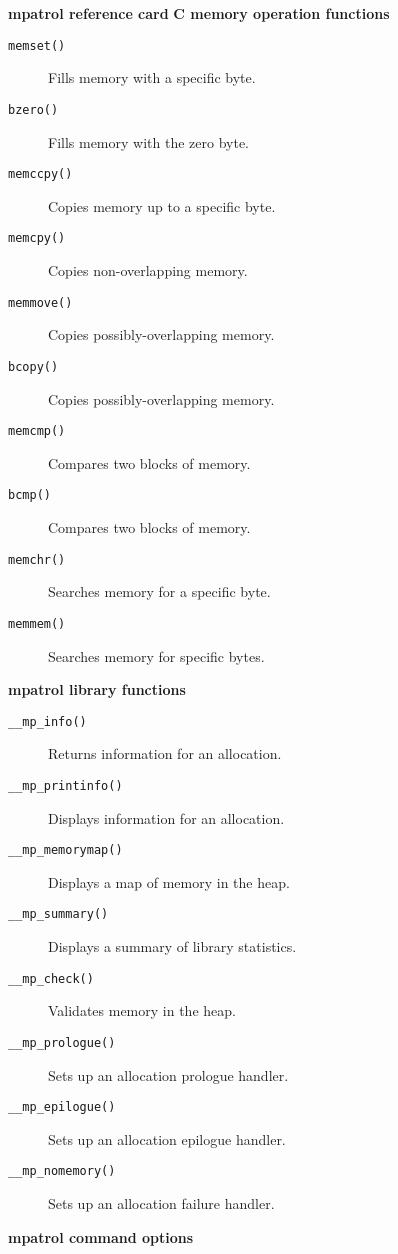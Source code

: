 \documentclass[a4paper,landscape,final]{article}
\newcommand{\heading}[1]{\textbf{\normalsize #1}}
\newcommand{\function}[1]{\texttt{#1()}}
\begin{document}
\begin{multicols}{3}{\textbf{\Large mpatrol reference card}}
\vskip 12pt
\heading{C memory operation functions}
\vskip 6pt

\begin{description}
\item[\function{memset}]
\hfill Fills memory with a specific byte.
\item[\function{bzero}]
\hfill Fills memory with the zero byte.
\item[\function{memccpy}]
\hfill Copies memory up to a specific byte.
\item[\function{memcpy}]
\hfill Copies non-overlapping memory.
\item[\function{memmove}]
\hfill Copies possibly-overlapping memory.
\item[\function{bcopy}]
\hfill Copies possibly-overlapping memory.
\item[\function{memcmp}]
\hfill Compares two blocks of memory.
\item[\function{bcmp}]
\hfill Compares two blocks of memory.
\item[\function{memchr}]
\hfill Searches memory for a specific byte.
\item[\function{memmem}]
\hfill Searches memory for specific bytes.
\end{description}

\vskip 12pt
\heading{mpatrol library functions}
\vskip 6pt

\begin{description}
\item[\function{\_\_mp\_info}]
\hfill Returns information for an allocation.
\item[\function{\_\_mp\_printinfo}]
\hfill Displays information for an allocation.
\item[\function{\_\_mp\_memorymap}]
\hfill Displays a map of memory in the heap.
\item[\function{\_\_mp\_summary}]
\hfill Displays a summary of library statistics.
\item[\function{\_\_mp\_check}]
\hfill Validates memory in the heap.
\item[\function{\_\_mp\_prologue}]
\hfill Sets up an allocation prologue handler.
\item[\function{\_\_mp\_epilogue}]
\hfill Sets up an allocation epilogue handler.
\item[\function{\_\_mp\_nomemory}]
\hfill Sets up an allocation failure handler.
\end{description}

\vskip 12pt
\heading{mpatrol command options}
\vskip 6pt


\end{multicols}
\end{document}
